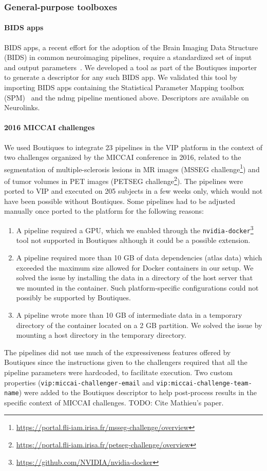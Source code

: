 \documentclass[a4paper,num-refs]{oup-contemporary}
\newcommand{\todo}[1]{\color{red}TODO: #1\color{black}}
\newcommand{\boutiques}{Boutiques\xspace}
\begin{document}
\subsubsection{General-purpose toolboxes}

\paragraph{BIDS apps} BIDS apps, a recent effort for the adoption of the Brain Imaging Data Structure (BIDS)
in common neuroimaging pipelines, require a standardized set of input
and output parameters~\cite{gorgolewski2017bids}. We developed a tool
as part of the \boutiques importer to generate a descriptor for any
such BIDS app. We validated this tool by importing 
BIDS apps containing the Statistical Parameter Mapping toolbox
(SPM)~\cite{penny2011statistical} and the ndmg pipeline mentioned
above. Descriptors are available on Neurolinks.

\paragraph{2016 MICCAI challenges}
We used \boutiques to integrate 23 pipelines in the VIP platform in
the context of two challenges organized by the MICCAI conference in
2016, related to the segmentation of multiple-sclerosis lesions in MR
images (MSSEG
challenge\footnote{\url{https://portal.fli-iam.irisa.fr/msseg-challenge/overview}})
and of tumor volumes in PET images (PETSEG
challenge\footnote{\url{https://portal.fli-iam.irisa.fr/petseg-challenge/overview}}). The
pipelines were ported to VIP and executed on 205 subjects in a few
weeks only, which would not have been possible without
\boutiques. Some pipelines had to be adjusted manually once ported to
the platform for the following reasons:
\begin{enumerate}
\item A pipeline
  required a GPU, which we enabled through the
  \texttt{nvidia-docker}\footnote{\url{https://github.com/NVIDIA/nvidia-docker}}
  tool not supported in Boutiques although it could be a possible extension.
\item A pipeline required more than 10 GB of data dependencies (atlas
  data) which exceeded the maximum size allowed for Docker containers
  in our setup. We solved the issue by installing the data in a
  directory of the host server that we mounted in the container. Such
  platform-specific configurations could not possibly be supported by
  \boutiques.
\item A pipeline wrote more than 10 GB of intermediate data in a
  temporary directory of the container located on a 2 GB partition. We
  solved the issue by mounting a host directory in the temporary directory. 
\end{enumerate}
The pipelines did not use much of the expressiveness features offered
by \boutiques since the instructions given to the challengers required
that all the pipeline parameters were hardcoded, to facilitate
execution. Two custom properties (\texttt{vip:miccai-challenger-email}
and \texttt{vip:miccai-challenge-team-name}) were added to the
\boutiques descriptor to help post-process results in the specific
context of MICCAI challenges.
\todo{Cite Mathieu's paper.}
\end{document}
